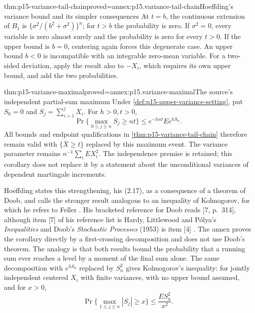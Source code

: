 \begin{hbtheorem}{thm:p15-variance-tail-chain}{proved=annex:p15.variance-tail-chain}{Hoeffding's variance bound and its simpler consequences}
At \(t=b\), the continuous extension of \(B_1\) is
\(\{\sigma^2/(b^2+\sigma^2)\}^n\); for \(t>b\) the probability is zero.
If \(\sigma^2=0\), every variable is zero almost surely and the probability
is zero for every \(t>0\). If the upper bound is \(b=0\), centering again
forces this degenerate case. An upper bound \(b<0\) is incompatible with
an integrable zero-mean variable.
For a two-sided deviation, apply the result also to \(-X_i\), which
requires its own upper bound, and add the two probabilities.
\end{hbtheorem}

\begin{hbcorollary}{thm:p15-variance-maximal}{proved=annex:p15.variance-maximal}{The source's independent partial-sum maximum}
Under \cref{def:p15-upper-variance-setting}, put
\(S_0=0\) and \(S_j=\sum_{i=1}^jX_i\). For \(h>0,t>0\),
\[
 \Pr\{\max_{0\leq j\leq n}S_j\geq nt\}
 \leq e^{-hnt}Ee^{hS_n}.
\]
All bounds and endpoint qualifications in
\cref{thm:p15-variance-tail-chain} therefore remain valid with
\(\{\overline X\geq t\}\) replaced by this maximum event.
The variance parameter remains \(n^{-1}\sum_i EX_i^2\).
The independence premise is retained; this corollary does not replace
it by a statement about the unconditional variances of dependent
martingale increments.

Hoeffding states this strengthening, his (2.17), as a consequence of a
theorem of Doob, and calls the stronger result analogous to an
inequality of Kolmogorov, for which he refers to Feller
\cite[pp.~17--18]{Hoeffding1963BoundedSums}. His bracketed reference
for Doob reads [7, p.~314], although item [7] of his reference list is
Hardy, Littlewood and P\'olya's \emph{Inequalities} and Doob's
\emph{Stochastic Processes} (1953) is item [4]
\cite[p.~29]{Hoeffding1963BoundedSums}. The annex proves the corollary
directly by a first-crossing decomposition and does not use Doob's
theorem. The analogy is that both results bound the probability that a
running sum ever reaches a level by a moment of the final sum alone. The
same decomposition with \(e^{hS_n}\) replaced by \(S_n^2\) gives
Kolmogorov's inequality: for jointly independent centered \(X_i\) with
finite variances, with no upper bound assumed, and for \(x>0\),
\[
 \Pr\{\max_{1\leq j\leq n}|S_j|\geq x\}\leq\frac{ES_n^2}{x^2}.
\]
\end{hbcorollary}

